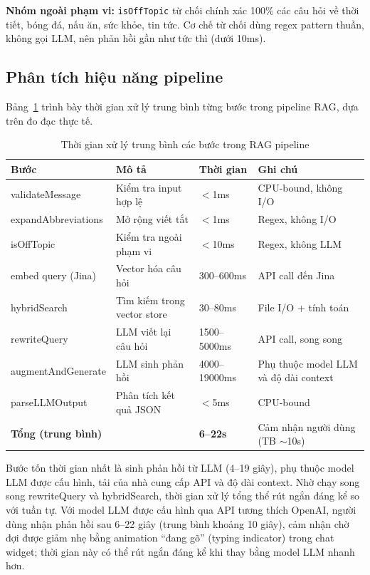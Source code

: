 \textbf{Nhóm ngoài phạm vi:} \texttt{isOffTopic} từ chối chính xác 100\% các câu hỏi về thời tiết, bóng đá, nấu ăn, sức khỏe, tin tức. Cơ chế từ chối dùng regex pattern thuần, không gọi LLM, nên phản hồi gần như tức thì (dưới 10ms).

\subsection{Phân tích hiệu năng pipeline}

Bảng~\ref{tab:rag_latency} trình bày thời gian xử lý trung bình từng bước trong pipeline RAG, dựa trên đo đạc thực tế.

\begin{table}[H]
  \centering
  \caption{Thời gian xử lý trung bình các bước trong RAG pipeline}
  \label{tab:rag_latency}
  \begin{tabular}{|l|p{5cm}|p{2cm}|p{3cm}|}
    \hline
    \textbf{Bước} & \textbf{Mô tả} & \textbf{Thời gian} & \textbf{Ghi chú} \\
    \hline
    validateMessage & Kiểm tra input hợp lệ & $<$1ms & CPU-bound, không I/O \\
    \hline
    expandAbbreviations & Mở rộng viết tắt & $<$1ms & Regex, không I/O \\
    \hline
    isOffTopic & Kiểm tra ngoài phạm vi & $<$10ms & Regex, không LLM \\
    \hline
    embed query (Jina) & Vector hóa câu hỏi & 300--600ms & API call đến Jina \\
    \hline
    hybridSearch & Tìm kiếm trong vector store & 30--80ms & File I/O + tính toán \\
    \hline
    rewriteQuery & LLM viết lại câu hỏi & 1500--5000ms & API call, song song \\
    \hline
    augmentAndGenerate & LLM sinh phản hồi & 4000--19000ms & Phụ thuộc model LLM và độ dài context \\
    \hline
    parseLLMOutput & Phân tích kết quả JSON & $<$5ms & CPU-bound \\
    \hline
    \textbf{Tổng (trung bình)} & & \textbf{6--22s} & Cảm nhận người dùng (TB $\sim$10s) \\
    \hline
  \end{tabular}
\end{table}

Bước tốn thời gian nhất là sinh phản hồi từ LLM (4--19 giây), phụ thuộc model LLM được cấu hình, tải của nhà cung cấp API và độ dài context. Nhờ chạy song song rewriteQuery và hybridSearch, thời gian xử lý tổng thể rút ngắn đáng kể so với tuần tự. Với model LLM được cấu hình qua API tương thích OpenAI, người dùng nhận phản hồi sau 6--22 giây (trung bình khoảng 10 giây), cảm nhận chờ đợi được giảm nhẹ bằng animation ``đang gõ'' (typing indicator) trong chat widget; thời gian này có thể rút ngắn đáng kể khi thay bằng model LLM nhanh hơn.


